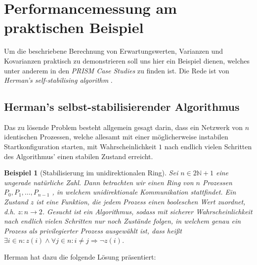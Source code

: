 \documentclass[a4paper]{article}
\newtheorem{beispiel}[satz]{Beispiel}
\theoremstyle{nonumberplain}
\begin{document}
\section{Performancemessung am praktischen Beispiel}

Um die beschriebene Berechnung von Erwartungswerten, Varianzen und Kovarianzen praktisch zu demonstrieren soll uns hier ein Beispiel dienen, welches unter anderem in den \textit{PRISM Case Studies} \cite{PRISMCS} zu finden ist. Die Rede ist von \textit{Herman's self-stabilising algorithm} \cite{Her90}.

\subsection{Herman's selbst-stabilisierender Algorithmus}

Das zu lösende Problem besteht allgemein gesagt darin, dass ein Netzwerk von $n$ identischen Prozessen, welche allesamt mit einer möglicherweise instabilen Startkonfiguration starten, mit Wahrscheinlichkeit $1$ nach endlich vielen Schritten des Algorithmus' einen stabilen Zustand erreicht.

\begin{beispiel}[Stabilisierung im unidirektionalen Ring]
	Sei $n \in 2\mathbb{N}+1$ eine ungerade natürliche Zahl. Dann betrachten wir einen Ring von $n$ Prozessen $P_0, P_1, \dots, P_{n-1}$ , in welchem unidirektionale Kommunikation stattfindet. Ein Zustand $z$ ist eine Funktion, die jedem Prozess einen booleschen Wert zuordnet, d.h. $z : n \to 2$.
	Gesucht ist ein Algorithmus, sodass mit sicherer Wahrscheinlichkeit nach endlich vielen Schritten nur noch Zustände folgen, in welchem genau ein Prozess als privilegierter Prozess ausgewählt ist, dass heißt $\exists i \in n : z(i) \land \forall j \in n: i\neq j \Rightarrow \neg z(i)$.
\end{beispiel}

Herman hat dazu die folgende Lösung präsentiert:
\end{document}
